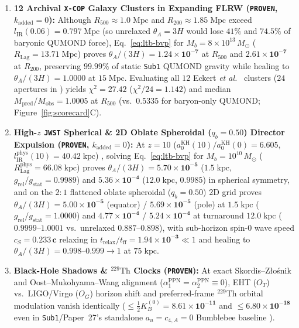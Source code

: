 \documentclass[11pt,a4paper]{article}
\begin{document}
\begin{enumerate}
  \item \textbf{12 Archival {\upshape\texttt{X-COP}} Galaxy Clusters in Expanding FLRW ({\upshape\texttt{PROVEN}}, $k_{\mathrm{added}} = 0$):} Although $R_{500} \approx 1.0\;\mathrm{Mpc}$ and $R_{200} \approx 1.85\;\mathrm{Mpc}$ exceed $l_{\mathrm{IR}}(0.06) = 0.797\;\mathrm{Mpc}$ (so unrelaxed $\theta_A = 3H$ would lose $41\%$ and $74.5\%$ of baryonic QUMOND force), Eq.~\eqref{eq:ltb-bvp} for $M_b = 8\times 10^{13}\,M_\odot$ ($R_{\mathrm{Lag}} = 13.71\;\mathrm{Mpc}$) proves $\theta_A/(3H) = \mathbf{1.24\times 10^{-7}}$ at $R_{500}$ and $\mathbf{2.61\times 10^{-7}}$ at $R_{200}$, preserving $\mathbf{99.99\%}$ of static {\upshape\texttt{Sub1}} QUMOND gravity while healing to $\theta_A/(3H) = \mathbf{1.0000}$ at $15\;\mathrm{Mpc}$. Evaluating all $12$ Eckert \textit{et al.}\ \cite{Eckert2019XCOP} clusters ($24$ apertures in ) yields $\chi^2 = \mathbf{27.42}$ ($\chi^2/24 = \mathbf{1.142}$) and median $M_{\mathrm{pred}}/M_{\mathrm{obs}} = \mathbf{1.0005}$ at $R_{500}$ (vs.\ $0.5335$ for baryon-only QUMOND; Figure~\ref{fig:scorecard}C).
  \item \textbf{High-$z$ {\upshape\texttt{JWST}} Spherical \& 2D Oblate Spheroidal ($q_b = 0.50$) Director Expulsion ({\upshape\texttt{PROVEN}}, $k_{\mathrm{added}} = 0$):} At $z = 10$ ($a_0^{\mathrm{KH}}(10)/a_0^{\mathrm{KH}}(0) = \mathbf{6.605}$, $l_{\mathrm{IR}}^{\mathrm{phys}}(10) = 40.42\;\mathrm{kpc}$) \cite{McGaugh2024JWST}, solving Eq.~\eqref{eq:ltb-bvp} for $M_b = 10^{10}\,M_\odot$ ($R_{\mathrm{Lag}}^{\mathrm{phys}} = 66.08\;\mathrm{kpc}$) proves $\theta_A/(3H) = \mathbf{5.70\times 10^{-5}}$ ($1.5\;\mathrm{kpc}$, $g_{\mathrm{rel}}/g_{\mathrm{stat}} = \mathbf{0.9989}$) and $\mathbf{5.36\times 10^{-4}}$ ($12.0\;\mathrm{kpc}$, $\mathbf{0.9985}$) in spherical symmetry, and on the $2\!:\!1$ flattened oblate spheroidal ($q_b = 0.50$) 2D grid proves $\theta_A/(3H) = \mathbf{5.00\times 10^{-5}}$ (equator) / $\mathbf{5.69\times 10^{-5}}$ (pole) at $1.5\;\mathrm{kpc}$ ($g_{\mathrm{rel}}/g_{\mathrm{stat}} = \mathbf{1.0000}$) and $\mathbf{4.77\times 10^{-4}}$ / $\mathbf{5.24\times 10^{-4}}$ at turnaround $12.0\;\mathrm{kpc}$ ($\mathbf{0.9999\text{--}1.0001}$ vs.\ unrelaxed $0.887\text{--}0.898$), with sub-horizon spin-0 wave speed $c_S = \mathbf{0.233\,c}$ relaxing in $t_{\mathrm{relax}}/t_{\mathrm{ff}} = \mathbf{1.94\times 10^{-3}} \ll 1$ and healing to $\theta_A/(3H) = \mathbf{0.998\text{--}0.999} \to 1$ at $75\;\mathrm{kpc}$.
  \item \textbf{Black-Hole Shadows \& $^{229}\mathrm{Th}$ Clocks ({\upshape\texttt{PROVEN}}):} At exact Skordis--Z\l{}o\'snik and Oost--Mukohyama--Wang alignment ($\alpha_1^{\mathrm{PPN}} = \alpha_2^{\mathrm{PPN}} \equiv 0$), EHT ($O_T$) vs.\ LIGO/Virgo ($O_G$) horizon shift and preferred-frame $^{229}\mathrm{Th}$ orbital modulation vanish identically ($\le \frac{1}{2}K_B^{(0)} = \mathbf{8.61\times 10^{-11}}$ and $\le \mathbf{6.80\times 10^{-18}}$ even in {\upshape\texttt{Sub1}}/Paper~27's standalone $a_u = c_{4,A} = 0$ Bumblebee baseline \cite{Lange2021,Tiedau2024Th229}).
\end{enumerate}
\end{document}
